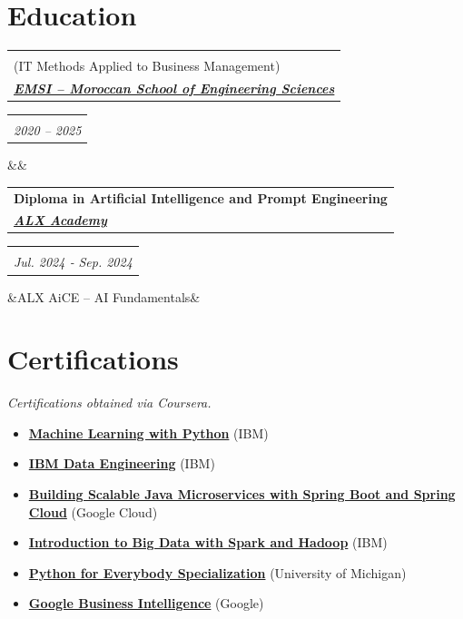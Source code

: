 \documentclass[10pt,a4paper,sans]{moderncv}
\makeatletter
\newcommand*{\customcventry}[7][.10em]{%
\begin{tabular}{@{}l}
    {\bfseries #4} \\
    {\itshape #3}
\end{tabular}
\hfill
\begin{tabular}{l@{}}
    {\bfseries #5} \\
    {\itshape #2}
\end{tabular}
\ifx&#7&%
\else{\\
\begin{minipage}{\maincolumnwidth}%
    \footnotesize#7%
\end{minipage}}\fi%
\par\addvspace{#1}
}
\makeatother
\begin{document}
\vspace{-17pt}
\section{\fontsize{11}{12.1}\selectfont Education}
\vspace{-4pt}
\customcventry{2020 -- 2025}{\href{https://emsi.ma}{\textbf{EMSI – Moroccan School of Engineering Sciences}}}{Master’s degree in Software Engineering and Networks \\ (IT Methods Applied to Business Management)}{}{}{}
\customcventry{Jul. 2024 ‐ Sep. 2024}{\href{https://www.alxafrica.com}{\textbf{ALX Academy}}}{Diploma in Artificial Intelligence and Prompt Engineering}{}{}{ALX AiCE – AI Fundamentals}

\vspace{-18pt}
\section{\fontsize{11}{12.1}\selectfont Certifications}
\vspace{-5pt}
\textit{Certifications obtained via Coursera.}
\begin{itemize}[leftmargin=0.3cm, itemsep=-2pt, topsep=0pt, partopsep=0pt, parsep=0pt]
    \item \textbf{\href{https://www.coursera.org/account/accomplishments/verify/G178XXP17WQA}{Machine Learning with Python}} (IBM)
    \item \textbf{\href{https://www.coursera.org/account/accomplishments/records/M5RKGX36BAVA}{IBM Data Engineering}} (IBM)
    \item \textbf{\href{https://google.com}{Building Scalable Java Microservices with Spring Boot and Spring Cloud}} (Google Cloud)
    \item \textbf{\href{https://www.coursera.org/account/accomplishments/verify/EK5SJM3YM7PX}{Introduction to Big Data with Spark and Hadoop}} (IBM)
    \item \textbf{\href{https://www.coursera.org/account/accomplishments/specialization/B4RCUAYCUG49}{Python for Everybody Specialization}} (University of Michigan)
    \item \textbf{\href{https://www.coursera.org/account/accomplishments/records/G867SJLRFQS2}{Google Business Intelligence}} (Google)
\end{itemize}

\vspace{-18pt}
\end{document}
